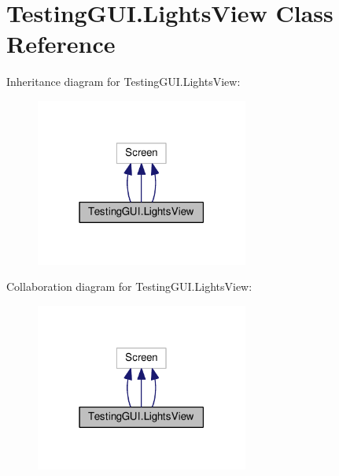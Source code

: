 \hypertarget{classTestingGUI_1_1LightsView}{}\section{Testing\+G\+U\+I.\+Lights\+View Class Reference}
\label{classTestingGUI_1_1LightsView}


Inheritance diagram for Testing\+G\+U\+I.\+Lights\+View\+:
\nopagebreak
\begin{figure}[H]
\begin{center}
\leavevmode
\includegraphics[width=198pt]{classTestingGUI_1_1LightsView__inherit__graph}
\end{center}
\end{figure}


Collaboration diagram for Testing\+G\+U\+I.\+Lights\+View\+:
\nopagebreak
\begin{figure}[H]
\begin{center}
\leavevmode
\includegraphics[width=198pt]{classTestingGUI_1_1LightsView__coll__graph}
\end{center}
\end{figure}
